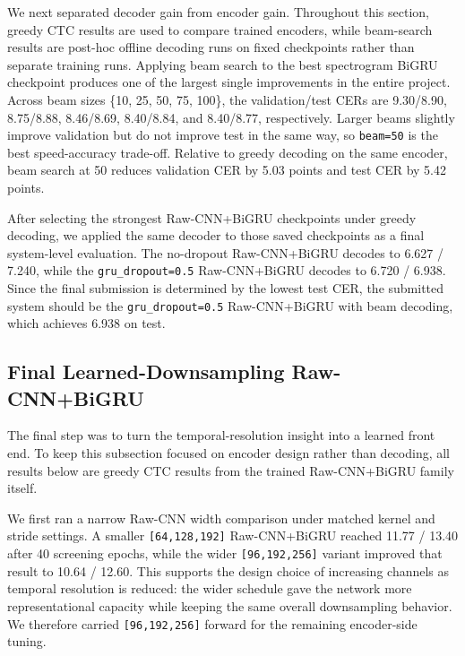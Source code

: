 We next separated decoder gain from encoder gain. Throughout this section, greedy CTC results are used to compare trained encoders, while beam-search results are post-hoc offline decoding runs on fixed checkpoints rather than separate training runs. Applying beam search to the best spectrogram BiGRU checkpoint produces one of the largest single improvements in the entire project. Across beam sizes \{10, 25, 50, 75, 100\}, the validation/test CERs are 9.30/8.90, 8.75/8.88, 8.46/8.69, 8.40/8.84, and 8.40/8.77, respectively. Larger beams slightly improve validation but do not improve test in the same way, so \texttt{beam=50} is the best speed-accuracy trade-off. Relative to greedy decoding on the same encoder, beam search at 50 reduces validation CER by 5.03 points and test CER by 5.42 points.

After selecting the strongest Raw-CNN+BiGRU checkpoints under greedy decoding, we applied the same decoder to those saved checkpoints as a final system-level evaluation. The no-dropout Raw-CNN+BiGRU decodes to 6.627 / 7.240, while the \texttt{gru\_dropout=0.5} Raw-CNN+BiGRU decodes to 6.720 / 6.938. Since the final submission is determined by the lowest test CER, the submitted system should be the \texttt{gru\_dropout=0.5} Raw-CNN+BiGRU with beam decoding, which achieves 6.938 on test.

\subsection{Final Learned-Downsampling Raw-CNN+BiGRU}

The final step was to turn the temporal-resolution insight into a learned front end. To keep this subsection focused on encoder design rather than decoding, all results below are greedy CTC results from the trained Raw-CNN+BiGRU family itself.

We first ran a narrow Raw-CNN width comparison under matched kernel and stride settings. A smaller \texttt{[64,128,192]} Raw-CNN+BiGRU reached 11.77 / 13.40 after 40 screening epochs, while the wider \texttt{[96,192,256]} variant improved that result to 10.64 / 12.60. This supports the design choice of increasing channels as temporal resolution is reduced: the wider schedule gave the network more representational capacity while keeping the same overall downsampling behavior. We therefore carried \texttt{[96,192,256]} forward for the remaining encoder-side tuning.

